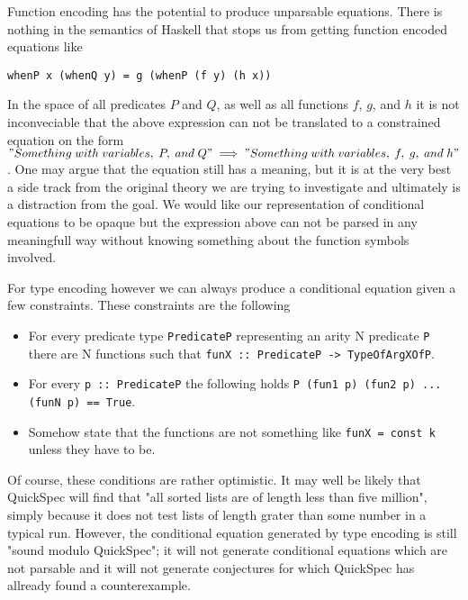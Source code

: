 Function encoding has the potential to produce unparsable equations.
There is nothing in the semantics of Haskell that stops us from getting function
encoded equations like
\begin{verbatim}whenP x (whenQ y) = g (whenP (f y) (h x))\end{verbatim}
In the space of all predicates $P$ and $Q$, as well as all functions $f$, $g$, and $h$ it
is not inconveciable that the above expression can not be translated to a constrained
equation on the form\\$"Something\;with\;variables,\;P,\;and\;Q"\implies "Something\;with\;variables,\;f,\;g,\;and\;h"$.
One may argue that the equation still has a meaning, but it is at the very best a side track
from the original theory we are trying to investigate and ultimately is a distraction from the goal.
We would like our representation of conditional equations to be opaque but the expression above
can not be parsed in any meaningfull way without knowing something about the function symbols involved.

For type encoding however we can always produce a conditional equation given a few constraints.
These constraints are the following
\begin{itemize}
    \item For every predicate type \texttt{PredicateP} representing an arity N predicate \texttt{P}
        there are N functions such that \texttt{funX :: PredicateP -> TypeOfArgXOfP}.
    \item For every \texttt{p :: PredicateP} the following holds \texttt{P (fun1 p) (fun2 p) ... (funN p) == True}.
    \item Somehow state that the functions are not something like \texttt{funX = const k} unless they have to be.
\end{itemize}
Of course, these conditions are rather optimistic. It may well be likely that QuickSpec will find that "all sorted lists
are of length less than five million", simply because it does not test lists of length grater than some number in a typical
run. However, the conditional equation generated by type encoding is still "sound modulo QuickSpec"; it will not generate
conditional equations which are not parsable and it will not generate conjectures for which QuickSpec has allready found
a counterexample.
